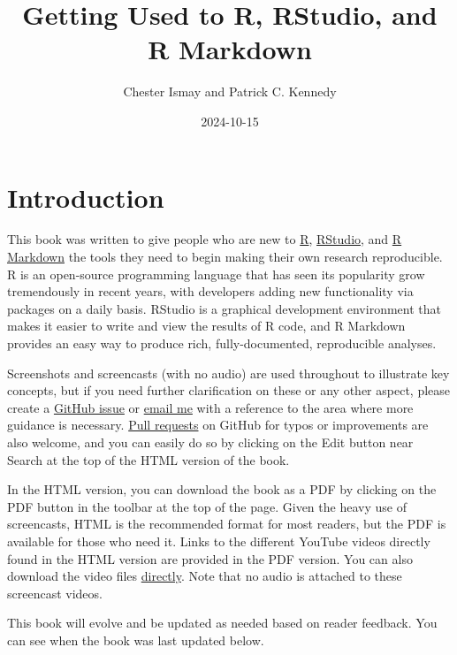 \documentclass[]{tufte-book}
\title{Getting Used to R, RStudio, and R Markdown}
\author{Chester Ismay and Patrick C. Kennedy}
\date{2024-10-15}
\begin{document}
\maketitle



{
\setcounter{tocdepth}{1}
\tableofcontents
}

\chapter{Introduction}\label{intro}

This book was written to give people who are new to \href{https://www.r-project.org}{R}, \href{https://posit.co/downloads/}{RStudio}, and \href{http://rmarkdown.rstudio.com}{R Markdown} the tools they need to begin making their own research reproducible. R is an open-source programming language that has seen its popularity grow tremendously in recent years, with developers adding new functionality via packages on a daily basis. RStudio is a graphical development environment that makes it easier to write and view the results of R code, and R Markdown provides an easy way to produce rich, fully-documented, reproducible analyses.

Screenshots and screencasts (with no audio) are used throughout to illustrate key concepts, but if you need further clarification on these or any other aspect, please create a \href{https://github.com/ismayc/rbasics-book/issues}{GitHub issue} or \href{mailto:chester.ismay@gmail.com}{email me} with a reference to the area where more guidance is necessary. \href{https://code.tutsplus.com/courses/git-basics-github-pull-requests}{Pull requests} on GitHub for typos or improvements are also welcome, and you can easily do so by clicking on the Edit button near Search at the top of the HTML version of the book.

In the HTML version, you can download the book as a PDF by clicking on the PDF button in the toolbar at the top of the page. Given the heavy use of screencasts, HTML is the recommended format for most readers, but the PDF is available for those who need it. Links to the different YouTube videos directly found in the HTML version are provided in the PDF version. You can also download the video files \href{https://github.com/ismayc/rbasics-book/tree/master/mp4}{directly}. Note that no audio is attached to these screencast videos.

This book will evolve and be updated as needed based on reader feedback. You can see when the book was last updated below.
\end{document}
